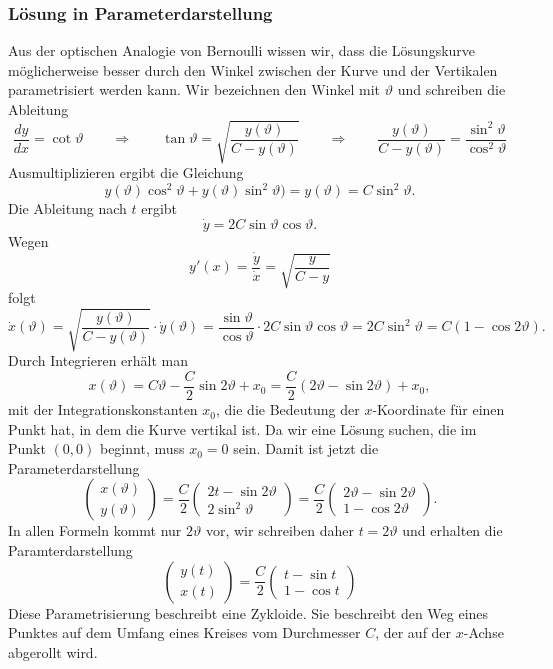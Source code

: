 %
%
\subsubsection{Lösung in Parameterdarstellung}
Aus der optischen Analogie von Bernoulli wissen wir, dass die Lösungskurve
möglicherweise besser durch den Winkel zwischen der Kurve und der Vertikalen
parametrisiert werden kann.
Wir bezeichnen den Winkel mit $\vartheta$ und schreiben die Ableitung
\[
\frac{dy}{dx}
=
\cot \vartheta
\qquad\Rightarrow\qquad
\tan \vartheta
=
\sqrt{\frac{y(\vartheta)}{C-y(\vartheta)}}
\qquad\Rightarrow\qquad
\frac{y(\vartheta)}{C-y(\vartheta)}
=
\frac{\sin^2 \vartheta}{\cos^2 \vartheta}
\]
Ausmultiplizieren ergibt die Gleichung
\[
y(\vartheta)\cos^2\vartheta +y(\vartheta)\sin^2\vartheta) = y(\vartheta) = C\sin^2\vartheta.
\]
Die Ableitung nach $t$ ergibt
\[
\dot{y}
=
2C\sin \vartheta\cos \vartheta.
\]
Wegen
\[
y'(x)
=
\frac{\dot{y}}{\dot{x}}
=
\sqrt{ \frac{y}{C-y}}
\]
folgt
\[
\dot{x}(\vartheta)
=
\sqrt{\frac{y(\vartheta)}{C-y(\vartheta)}}
\cdot\dot{y}(\vartheta)
=
\frac{\sin \vartheta}{\cos \vartheta}\cdot 2 C\sin \vartheta\cos \vartheta
=
2C\sin^2\vartheta
=
C(1-\cos 2\vartheta).
\]
Durch Integrieren erhält man
\[
x(\vartheta)
= 
C\vartheta - \frac{C}{2}\sin 2\vartheta
+ x_0
=
\frac{C}2(2\vartheta-\sin 2\vartheta)+x_0,
\]
mit der Integrationskonstanten $x_0$, die die Bedeutung der $x$-Koordinate
für einen Punkt hat, in dem die Kurve vertikal ist.
Da wir eine Lösung suchen, die im Punkt $(0,0)$ beginnt, muss $x_0=0$ sein.
Damit ist jetzt die Parameterdarstellung
\[
\begin{pmatrix}
x(\vartheta)\\
y(\vartheta)
\end{pmatrix}
=
\frac{C}{2}
\begin{pmatrix}
2t - \sin 2\vartheta\\
2\sin^2 \vartheta
\end{pmatrix}
=
\frac{C}{2}
\begin{pmatrix}
2\vartheta - \sin 2\vartheta\\
1  - \cos 2\vartheta
\end{pmatrix}.
\]
In allen Formeln kommt nur $2\vartheta$ vor, wir schreiben daher
$t=2\vartheta$ und erhalten die Paramterdarstellung
\begin{equation}
\begin{pmatrix}
y(t)\\
x(t)
\end{pmatrix}
=
\frac{C}{2}
\begin{pmatrix}
t-\sin t\\
1-\cos t
\end{pmatrix}
\label{buch:variation:eulerlagrange:eqn:zykloide}
\end{equation}
Diese Parametrisierung beschreibt eine Zykloide.
Sie beschreibt den Weg eines Punktes auf dem Umfang eines Kreises
vom Durchmesser $C$, der auf der $x$-Achse abgerollt wird.

